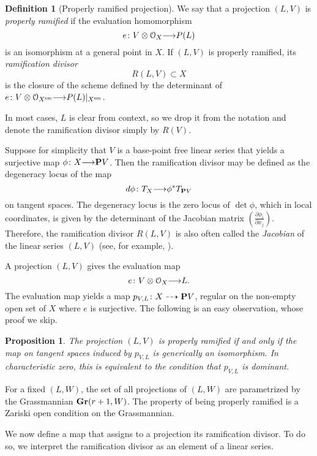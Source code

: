 \documentclass[11pt,reqno]{amsart}
\theoremstyle{plain}
\newtheorem{proposition}[theorem]{Proposition}
\theoremstyle{definition}
\newtheorem{definition}[theorem]{Definition}
\theoremstyle{remark}
\numberwithin{equation}{section}
\renewcommand{\to}{{\longrightarrow}}
\numberwithin{equation}{section}
\renewcommand{\O}{\mathcal O}
\begin{document}
\begin{definition}[Properly ramified projection]
  \label{def:properlyramified}
We say that a projection $(L,V)$ is \emph{properly ramified} if the evaluation homomorphism
\[e \from V \otimes \O_{X} \to P(L)\]
is an isomorphism at a general point in $X$.  If $(L,V)$ is properly ramified, its \emph{ramification divisor}
\[R(L,V) \subset X\]
is the closure of the scheme defined by the determinant of $e \from V \otimes \O_{X^{\rm sm}} \to P(L)|_{X^{\rm sm}}$.
\end{definition}
In most cases, $L$ is clear from context, so we drop it from the notation and denote the ramification divisor simply by $R(V)$.
\begin{remark}\label{rem:Jacobian}
  Suppose for simplicity that $V$ is a base-point free linear series that yields a surjective map $\phi \from X \to \P V$.
  Then the ramification divisor may be defined as the degeneracy locus of the map
  \[ d \phi \from T_{X} \to \phi^* T_{\P V}\]
  on tangent spaces.
  The degeneracy locus is the zero locus of $\det \phi$, which in local coordinates, is given by the determinant of the Jacobian matrix $\left( \frac{\partial \phi_i}{\partial x_j} \right)$.
  Therefore, the ramification divisor $R(L, V)$ is also often called the \emph{Jacobian} of the linear series $(L, V)$ (see, for example, \cite[1.1.7]{dol:12}).
\end{remark}

A projection $(L, V)$ gives the evaluation map
\[e \from V \otimes \O_X \to L.\]
The evaluation map yields a map $p_{V,L} {\colon} X \dashrightarrow {\bf P} V$, regular on the non-empty open set of $X$ where $e$ is surjective.
The following is an easy observation, whose proof we skip.
\begin{proposition}\label{prop:proj}
  The projection $(L, V)$ is properly ramified if and only if the map on tangent spaces induced by $p_{V,L}$ is generically an isomorphism.
  In characteristic zero, this is equivalent to the condition that $p_{V,L}$ is dominant.
\end{proposition}

For a fixed $(L, W)$, the set of all projections of $(L, W)$ are parametrized by the Grassmannian ${\bf Gr}(r+1, W)$.
The property of being properly ramified is a Zariski open condition on the Grassmannian.

We now define a map that assigns to a projection its ramification divisor.
To do so, we interpret the ramification divisor as an element of a linear series.
\end{document}
